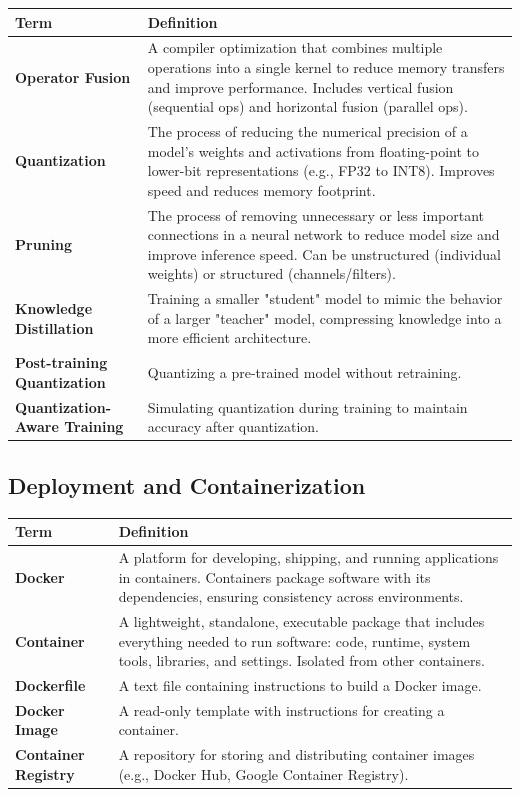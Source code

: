 \documentclass[11pt]{article}
\begin{document}
\begin{longtable}{|p{}|p{}|}
\hline
\textbf{Term} & \textbf{Definition} \\
\hline
\endhead
\textbf{Operator Fusion} & A compiler optimization that combines multiple operations into a single kernel to reduce memory transfers and improve performance. Includes vertical fusion (sequential ops) and horizontal fusion (parallel ops). \\
\hline
\textbf{Quantization} & The process of reducing the numerical precision of a model's weights and activations from floating-point to lower-bit representations (e.g., FP32 to INT8). Improves speed and reduces memory footprint. \\
\hline
\textbf{Pruning} & The process of removing unnecessary or less important connections in a neural network to reduce model size and improve inference speed. Can be unstructured (individual weights) or structured (channels/filters). \\
\hline
\textbf{Knowledge Distillation} & Training a smaller "student" model to mimic the behavior of a larger "teacher" model, compressing knowledge into a more efficient architecture. \\
\hline
\textbf{Post-training Quantization} & Quantizing a pre-trained model without retraining. \\
\hline
\textbf{Quantization-Aware Training} & Simulating quantization during training to maintain accuracy after quantization. \\
\hline
\end{longtable}

\subsection{Deployment and Containerization}

\begin{longtable}{|p{}|p{}|}
\hline
\textbf{Term} & \textbf{Definition} \\
\hline
\endhead
\textbf{Docker} & A platform for developing, shipping, and running applications in containers. Containers package software with its dependencies, ensuring consistency across environments. \\
\hline
\textbf{Container} & A lightweight, standalone, executable package that includes everything needed to run software: code, runtime, system tools, libraries, and settings. Isolated from other containers. \\
\hline
\textbf{Dockerfile} & A text file containing instructions to build a Docker image. \\
\hline
\textbf{Docker Image} & A read-only template with instructions for creating a container. \\
\hline
\textbf{Container Registry} & A repository for storing and distributing container images (e.g., Docker Hub, Google Container Registry). \\
\hline
\end{longtable}
\end{document}
